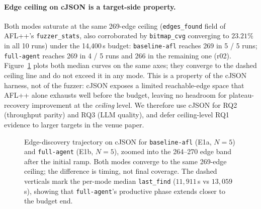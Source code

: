 \documentclass[11pt]{article}
\begin{document}
\paragraph{Edge ceiling on cJSON is a target-side property.}
Both modes saturate at the same 269-edge ceiling
(\texttt{edges\_found} field of AFL++'s \texttt{fuzzer\_stats},
also corroborated by \texttt{bitmap\_cvg} converging to
$23.21\%$ in all 10 runs) under the
14{,}400\,s budget: \texttt{baseline-afl} reaches 269 in 5 / 5
runs; \texttt{full-agent} reaches 269 in 4 / 5 runs and 266 in the
remaining one (r02). Figure~\ref{fig:coverage} plots both
median curves on the same axes; they converge to the dashed
ceiling line and do not exceed it in any mode. This is a property
of the cJSON harness, not of the fuzzer: cJSON exposes a limited
reachable-edge space that AFL++ alone exhausts well before the
budget, leaving no headroom for plateau-recovery improvement at
the \emph{ceiling} level. We therefore use cJSON for RQ2
(throughput parity) and RQ3 (LLM quality), and defer ceiling-level
RQ1 evidence to larger targets in the venue paper.

\begin{figure}[t]
  \centering
  
  \caption{Edge-discovery trajectory on cJSON for
  \texttt{baseline-afl} (E1a, $N{=}5$) and \texttt{full-agent}
  (E1b, $N{=}5$), zoomed into the 264--270 edge band after the
  initial ramp. Both modes converge to the same 269-edge ceiling;
  the difference is timing, not final coverage. The dashed verticals
  mark the per-mode median \texttt{last\_find}
  ($11{,}911$\,s vs $13{,}059$\,s), showing that
  \texttt{full-agent}'s productive phase extends closer to the budget
  end.}
  \label{fig:coverage}
\end{figure}
\end{document}
